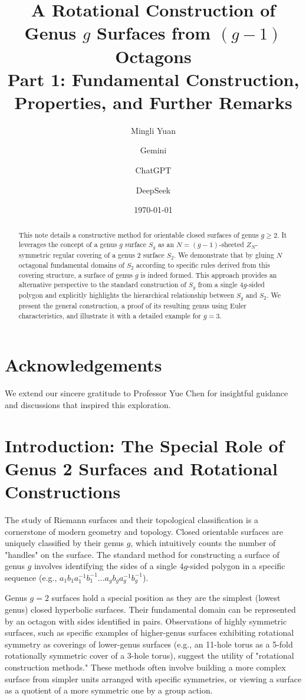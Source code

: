 \documentclass{article}
\title{A Rotational Construction of Genus $g$ Surfaces from $(g-1)$ Octagons\\ Part 1: Fundamental Construction, Properties, and Further Remarks}
\author{Mingli Yuan \and Gemini \and ChatGPT \and DeepSeek}
\date{\today}
\theoremstyle{definition}
\theoremstyle{remark}
\begin{document}
\maketitle

\begin{abstract}
This note details a constructive method for orientable closed surfaces of genus $g \ge 2$. It leverages the concept of a genus $g$ surface $S_g$ as an $N=(g-1)$-sheeted $Z_N$-symmetric regular covering of a genus 2 surface $S_2$. We demonstrate that by gluing $N$ octagonal fundamental domains of $S_2$ according to specific rules derived from this covering structure, a surface of genus $g$ is indeed formed. This approach provides an alternative perspective to the standard construction of $S_g$ from a single $4g$-sided polygon and explicitly highlights the hierarchical relationship between $S_g$ and $S_2$. We present the general construction, a proof of its resulting genus using Euler characteristics, and illustrate it with a detailed example for $g=3$.
\end{abstract}

\section*{Acknowledgements}
We extend our sincere gratitude to Professor Yue Chen for insightful guidance and discussions that inspired this exploration.

\section{Introduction: The Special Role of Genus 2 Surfaces and Rotational Constructions}

The study of Riemann surfaces and their topological classification is a cornerstone of modern geometry and topology. Closed orientable surfaces are uniquely classified by their genus $g$, which intuitively counts the number of "handles" on the surface. The standard method for constructing a surface of genus $g$ involves identifying the sides of a single $4g$-sided polygon in a specific sequence (e.g., $a_1 b_1 a_1^{-1} b_1^{-1} \ldots a_g b_g a_g^{-1} b_g^{-1}$).

Genus $g=2$ surfaces hold a special position as they are the simplest (lowest genus) closed hyperbolic surfaces. Their fundamental domain can be represented by an octagon with sides identified in pairs. Observations of highly symmetric surfaces, such as specific examples of higher-genus surfaces exhibiting rotational symmetry as coverings of lower-genus surfaces (e.g., an 11-hole torus as a 5-fold rotationally symmetric cover of a 3-hole torus), suggest the utility of "rotational construction methods." These methods often involve building a more complex surface from simpler units arranged with specific symmetries, or viewing a surface as a quotient of a more symmetric one by a group action.
\end{document}
